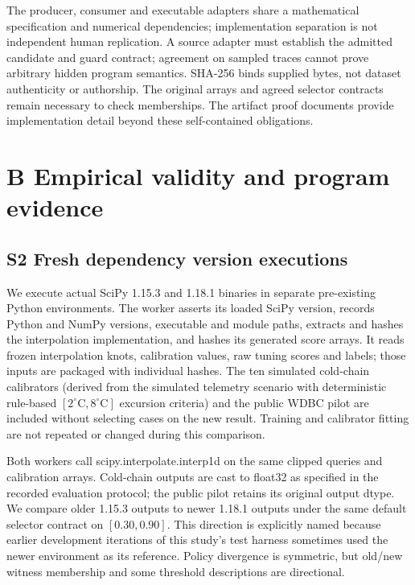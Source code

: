 \documentclass[11pt,a4paper]{article}
\theoremstyle{plain}
\theoremstyle{definition}
\theoremstyle{remark}
\begin{document}
The producer, consumer and executable adapters share a mathematical specification and numerical dependencies; implementation separation is not independent human replication. A source adapter must establish the admitted candidate and guard contract; agreement on sampled traces cannot prove arbitrary hidden program semantics. SHA-256 binds supplied bytes, not dataset authenticity or authorship. The original arrays and agreed selector contracts remain necessary to check memberships. The artifact proof documents provide implementation detail beyond these self-contained obligations.


\section*{B Empirical validity and program evidence}


\subsection*{S2 Fresh dependency version executions}\label{sec:s2}

We execute actual SciPy 1.15.3 and 1.18.1 binaries in separate pre-existing Python environments. The worker asserts its loaded SciPy version, records Python and NumPy versions, executable and module paths, extracts and hashes the interpolation implementation, and hashes its generated score arrays. It reads frozen interpolation knots, calibration values, raw tuning scores and labels; those inputs are packaged with individual hashes. The ten simulated cold-chain calibrators (derived from the simulated telemetry scenario with deterministic rule-based $[2^\circ\text{C}, 8^\circ\text{C}]$ excursion criteria) and the public WDBC pilot are included without selecting cases on the new result. Training and calibrator fitting are not repeated or changed during this comparison.

Both workers call scipy.interpolate.interp1d on the same clipped queries and calibration arrays. Cold-chain outputs are cast to float32 as specified in the recorded evaluation protocol; the public pilot retains its original output dtype. We compare older 1.15.3 outputs to newer 1.18.1 outputs under the same default selector contract on $[0.30, 0.90]$. This direction is explicitly named because earlier development iterations of this study's test harness sometimes used the newer environment as its reference. Policy divergence is symmetric, but old/new witness membership and some threshold descriptions are directional.
\end{document}
